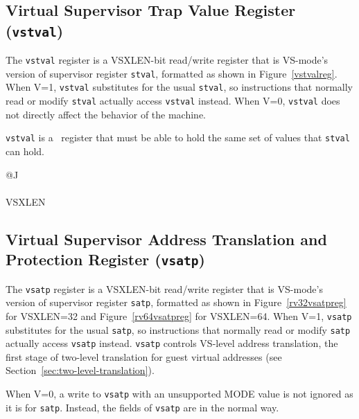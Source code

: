 \subsection{Virtual Supervisor Trap Value Register ({\tt vstval})}

The {\tt vstval} register is a VSXLEN-bit read/write register that is
VS-mode's version of supervisor register {\tt stval}, formatted as shown
in Figure~\ref{vstvalreg}.
When V=1, {\tt vstval} substitutes for the usual {\tt stval}, so
instructions that normally read or modify {\tt stval} actually access
{\tt vstval} instead.
When V=0, {\tt vstval} does not directly affect the behavior of the
machine.

{\tt vstval} is a \warl\ register that must be able to hold the same set of
values that {\tt stval} can hold.

\begin{figure*}[h!]
{\footnotesize
\begin{center}
\begin{tabular}{@{}J}
 \\
\hline
{} \\
\hline
VSXLEN \\
\end{tabular}
\end{center}
}
\vspace{-0.1in}
\caption{Virtual supervisor trap value register ({\tt vstval}).}
\label{vstvalreg}
\end{figure*}

\subsection{Virtual Supervisor Address Translation and Protection Register ({\tt vsatp})}

The {\tt vsatp} register is a VSXLEN-bit read/write register that is
VS-mode's version of supervisor register {\tt satp}, formatted as shown
in Figure~\ref{rv32vsatpreg} for VSXLEN=32 and Figure~\ref{rv64vsatpreg}
for VSXLEN=64.
When V=1, {\tt vsatp} substitutes for the usual {\tt satp}, so
instructions that normally read or modify {\tt satp} actually access
{\tt vsatp} instead.
{\tt vsatp} controls VS-level address translation, the first stage of
two-level translation for guest virtual addresses (see
Section~\ref{sec:two-level-translation}).

When V=0, a write to {\tt vsatp} with an unsupported MODE value is not
ignored as it is for {\tt satp}.
Instead, the fields of {\tt vsatp} are {\warl} in the normal way.

